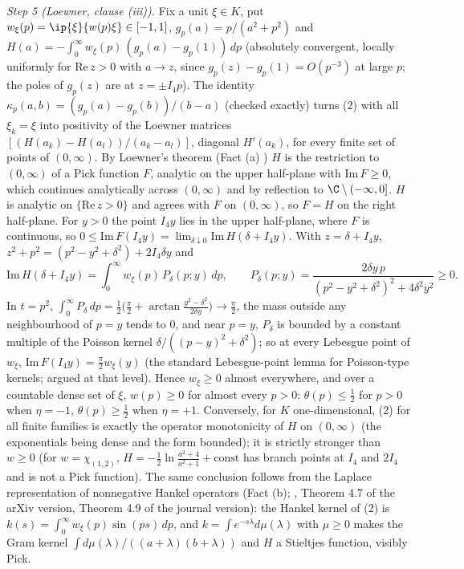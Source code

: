 \emph{Step 5 (Loewner, clause (iii)).} Fix a unit $\xi \in K$, put $w_{\xi}(p) = \ip{\xi}{w(p)\xi} \in [-1, 1]$, $g_{p}(a) = p/(a^{2} + p^{2})$ and $H(a) = -\int_{0}^{\infty}w_{\xi}(p)\,(g_{p}(a) - g_{p}(1))\,dp$ (absolutely convergent, locally uniformly for $\mathrm{Re}\,z > 0$ with $a \to z$, since $g_{p}(z) - g_{p}(1) = O(p^{-3})$ at large $p$; the poles of $g_{p}(z)$ are at $z = \pm I_{4}p$). The identity $\kappa_{p}(a, b) = (g_{p}(a) - g_{p}(b))/(b - a)$ (checked exactly) turns (2) with all $\xi_{k} = \xi$ into positivity of the Loewner matrices $[(H(a_{k}) - H(a_{l}))/(a_{k} - a_{l})]$, diagonal $H'(a_{k})$, for every finite set of points of $(0, \infty)$. By Loewner's theorem (Fact (a) \cite{Loewner1934}) $H$ is the restriction to $(0, \infty)$ of a Pick function $F$, analytic on the upper half-plane with $\mathrm{Im}\,F \ge 0$, which continues analytically across $(0, \infty)$ and by reflection to $\C\setminus(-\infty, 0]$. $H$ is analytic on $\{\mathrm{Re}\,z > 0\}$ and agrees with $F$ on $(0, \infty)$, so $F = H$ on the right half-plane. For $y > 0$ the point $I_{4}y$ lies in the upper half-plane, where $F$ is continuous, so $0 \le \mathrm{Im}\,F(I_{4}y) = \lim_{\delta\downarrow 0}\mathrm{Im}\,H(\delta + I_{4}y)$. With $z = \delta + I_{4}y$, $z^{2} + p^{2} = (p^{2} - y^{2} + \delta^{2}) + 2I_{4}\delta y$ and
\[ \mathrm{Im}\,H(\delta + I_{4}y) = \int_{0}^{\infty}w_{\xi}(p)\,P_{\delta}(p; y)\,dp, \qquad P_{\delta}(p; y) = \frac{2\delta y\,p}{(p^{2} - y^{2} + \delta^{2})^{2} + 4\delta^{2}y^{2}} \ge 0. \]
In $t = p^{2}$, $\int_{0}^{\infty}P_{\delta}\,dp = \tfrac12\big(\tfrac{\pi}{2} + \arctan\tfrac{y^{2} - \delta^{2}}{2\delta y}\big) \to \tfrac{\pi}{2}$, the mass outside any neighbourhood of $p = y$ tends to $0$, and near $p = y$, $P_{\delta}$ is bounded by a constant multiple of the Poisson kernel $\delta/((p - y)^{2} + \delta^{2})$; so at every Lebesgue point of $w_{\xi}$, $\mathrm{Im}\,F(I_{4}y) = \tfrac{\pi}{2}w_{\xi}(y)$ (the standard Lebesgue-point lemma for Poisson-type kernels; argued at that level). Hence $w_{\xi} \ge 0$ almost everywhere, and over a countable dense set of $\xi$, $w(p) \ge 0$ for almost every $p > 0$: $\theta(p) \le \tfrac12$ for $p > 0$ when $\eta = -1$, $\theta(p) \ge \tfrac12$ when $\eta = +1$. Conversely, for $K$ one-dimensional, (2) for all finite families is exactly the operator monotonicity of $H$ on $(0, \infty)$ (the exponentials being dense and the form bounded); it is strictly stronger than $w \ge 0$ (for $w = \chi_{(1, 2)}$, $H = -\tfrac12\ln\frac{a^{2} + 4}{a^{2} + 1} + \mathrm{const}$ has branch points at $I_{4}$ and $2I_{4}$ and is not a Pick function). The same conclusion follows from the Laplace representation of nonnegative Hankel operators (Fact (b); \cite{Yafaev2015}, Theorem 4.7 of the arXiv version, Theorem 4.9 of the journal version): the Hankel kernel of (2) is $k(s) = \int_{0}^{\infty}w_{\xi}(p)\sin(ps)\,dp$, and $k = \int e^{-s\lambda}d\mu(\lambda)$ with $\mu \ge 0$ makes the Gram kernel $\int d\mu(\lambda)/((a + \lambda)(b + \lambda))$ and $H$ a Stieltjes function, visibly Pick.

